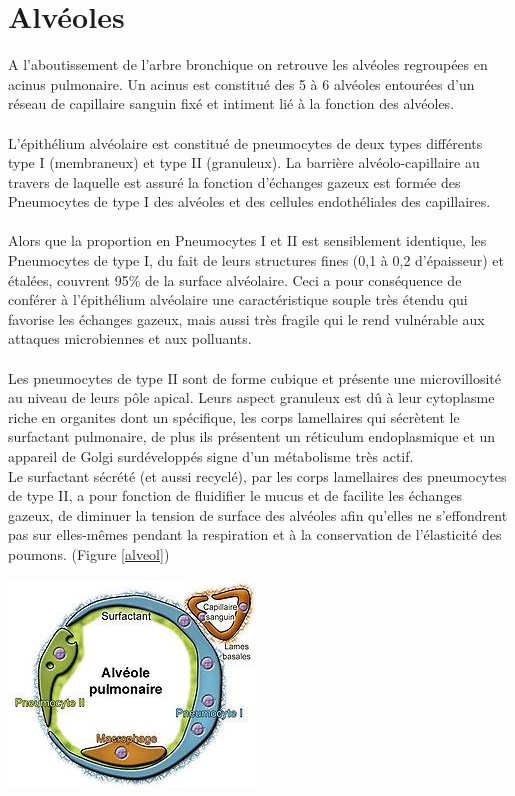 		\section{Alvéoles}
A l’aboutissement de l’arbre bronchique on retrouve les alvéoles regroupées en acinus pulmonaire. Un acinus est constitué des 5 à 6 alvéoles entourées d’un réseau de capillaire sanguin fixé et intiment lié à la fonction des alvéoles.\\
\\
L’épithélium alvéolaire est constitué de pneumocytes de deux types différents type I (membraneux) et type II (granuleux). La barrière alvéolo-capillaire au travers de laquelle est assuré la fonction d’échanges gazeux est formée des Pneumocytes de type I des alvéoles et des cellules endothéliales des capillaires. \\
\\
Alors que la proportion en Pneumocytes I et II est sensiblement identique, les Pneumocytes de type I, du fait de leurs structures fines (0,1 à {0,2}{\micro\metre} d'épaisseur) et étalées, couvrent 95\% de la surface alvéolaire. Ceci a pour conséquence de conférer à l’épithélium alvéolaire une caractéristique souple très étendu qui favorise les échanges gazeux, mais aussi très fragile qui le rend vulnérable aux attaques microbiennes et aux polluants.\\
\\
Les pneumocytes de type II sont de forme cubique et présente une microvillosité au niveau de leurs pôle apical. Leurs aspect granuleux est dû à leur cytoplasme riche en organites dont un spécifique, les corps lamellaires qui sécrètent le surfactant pulmonaire, de plus ils présentent un réticulum endoplasmique et un appareil de Golgi surdéveloppés signe d’un métabolisme très actif. \\
Le surfactant sécrété (et aussi recyclé), par les corps lamellaires des pneumocytes de type II, a pour fonction de fluidifier le mucus et de facilite les échanges gazeux, de diminuer la tension de surface des alvéoles afin qu'elles ne s'effondrent pas sur elles-mêmes pendant la respiration et à la conservation de l'élasticité des poumons. (Figure \ref{alveol})


\begin{center}
\includegraphics[scale=0.7]{gfx/alveole.jpg} 
       \label{alveol}
\end{center}

